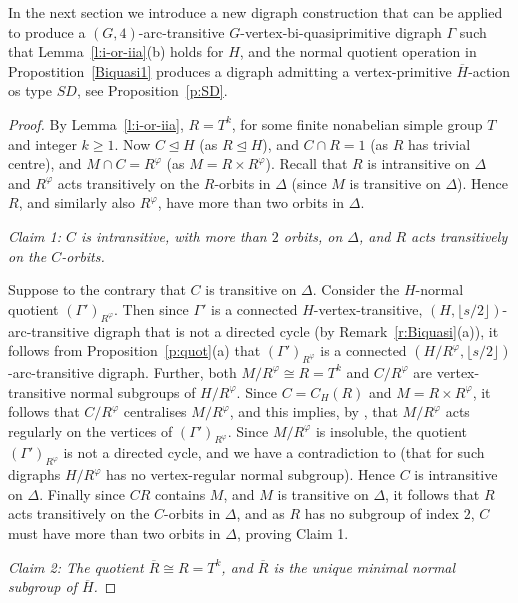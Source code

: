 \documentclass[11pt]{amsart}
\begin{document}
In the next section we introduce a new digraph construction that can be applied to produce a $(G,4)$-arc-transitive $G$-vertex-bi-quasiprimitive digraph $\Gamma$ such that  Lemma~\ref{l:i-or-iia}(b) holds for $H$, and the normal quotient operation in Propostition~\ref{Biquasi1} produces a digraph admitting a vertex-primitive $\overline{H}$-action os type \(SD\), see Proposition~\ref{p:SD}.


\begin{proof}
    By Lemma~\ref{l:i-or-iia}, $R=T^k$, for some finite nonabelian simple group $T$ and integer $k\geq1$.  Now $C\unlhd H$ (as $R\unlhd H$), and $C\cap R=1$ (as $R$ has trivial centre), and $M\cap C=R^\varphi$ (as $M=R\times R^\varphi$). Recall that $R$ is intransitive on $\Delta$ and $R^\varphi$ acts transitively on the $R$-orbits in $\Delta$ (since $M$ is transitive on $\Delta$). Hence $R$, and similarly also $R^\varphi$, have more than two orbits in $\Delta$. 

\smallskip\noindent
\emph{Claim 1: $C$ is intransitive, with more than $2$ orbits,  on $\Delta$, and $R$ acts transitively on the $C$-orbits.}


Suppose to the contrary that $C$ is transitive on $\Delta$. Consider the $H$-normal quotient $(\Gamma')_{R^\varphi}$. Then since $\Gamma'$ is a connected $H$-vertex-transitive, $(H,\lfloor s/2\rfloor)$-arc-transitive digraph that is not a directed cycle (by Remark~\ref{r:Biquasi}(a)), it follows from Proposition~\ref{p:quot}(a) that $(\Gamma')_{R^\varphi}$ is a connected $(H/R^\varphi,\lfloor s/2\rfloor)$-arc-transitive digraph. Further, both $M/R^\varphi\cong R= T^k$ and $C/R^\varphi$ are vertex-transitive normal subgroups of $H/R^\varphi$. Since $C=C_H(R)$ and $M=R\times R^\varphi$, it follows that $C/R^\varphi$ centralises $M/R^\varphi$, and this implies, by \cite[Theorem 3.2]{csaba}, that $M/R^\varphi$ acts regularly on the  vertices of $(\Gamma')_{R^\varphi}$. Since  $M/R^\varphi$ is insoluble, the quotient   $(\Gamma')_{R^\varphi}$ is not a directed cycle, and we have a contradiction to \cite[Theorem 3.1]{Praeger} (that for such digraphs $H/R^\varphi$ has no vertex-regular normal subgroup). Hence $C$ is intransitive on $\Delta$. Finally  since $CR$ contains $M$, and $M$ is transitive on $\Delta$, it follows that $R$ acts transitively on the $C$-orbits in $\Delta$, and as $R$ has no subgroup of index $2$, $C$ must have more than two orbits in $\Delta$, proving  Claim 1.

\smallskip\noindent
\emph{Claim 2: The quotient $\overline{R}\cong R=T^k$, and $\overline{R}$ is the unique minimal normal subgroup of $\overline{H}$.}


\end{proof}
\end{document}
